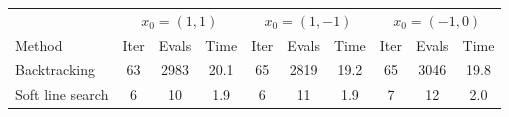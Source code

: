 \begin{tabular}{l|ccc|ccc|ccc} \hline \hline 
& \multicolumn{3}{c}{$x_0 = (1,1)$} & \multicolumn{3}{c}{$x_0 = (1,-1)$} & \multicolumn{3}{c}{$x_0 = (-1,0)$} \\ 
Method & Iter & Evals & Time & Iter & Evals & Time & Iter & Evals & Time \\ \hline 
Backtracking & 63 & 2983 & 20.1 & 65 & 2819 & 19.2 & 65 & 3046 & 19.8 \\ 
Soft line search & 6 & 10 & 1.9 & 6 & 11 & 1.9 & 7 & 12 & 2.0 \\ 
\hline \hline 
\end{tabular} 
